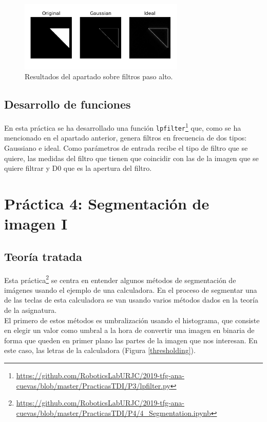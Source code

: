 \begin{figure}[h]
\centering
\includegraphics[width=0.7\textwidth]{imagenes/fpa}
\caption{Resultados del apartado sobre filtros paso alto.}
\label{fpa}
\end{figure}

\subsection{Desarrollo de funciones}

En esta práctica se ha desarrollado una función \texttt{lpfilter}\footnote{\url{https://github.com/RoboticsLabURJC/2019-tfg-ana-cuevas/blob/master/PracticasTDI/P3/lpfilter.py}} que, como se ha mencionado en el apartado anterior, genera filtros en frecuencia de dos tipos: Gaussiano e ideal. Como parámetros de entrada recibe el tipo de filtro que se quiere, las medidas del filtro que tienen que coincidir con las de la imagen que se quiere filtrar y D0 que es la apertura del filtro.\\

\section{Práctica 4: Segmentación de imagen I}
\subsection{Teoría tratada}

Esta práctica\footnote{\url{https://github.com/RoboticsLabURJC/2019-tfg-ana-cuevas/blob/master/PracticasTDI/P4/4_Segmentation.ipynb}} se centra en entender algunos métodos de segmentación de imágenes usando el ejemplo de una calculadora. En el proceso de segmentar una de las teclas de esta calculadora se van usando varios métodos dados en la teoría de la asignatura.\\

El primero de estos métodos es umbralización usando el histograma, que consiste en elegir un valor como umbral a la hora de convertir una imagen en binaria de forma que queden en primer plano las partes de la imagen que nos interesan. En este caso, las letras de la calculadora (Figura \ref{thresholding}).\\


